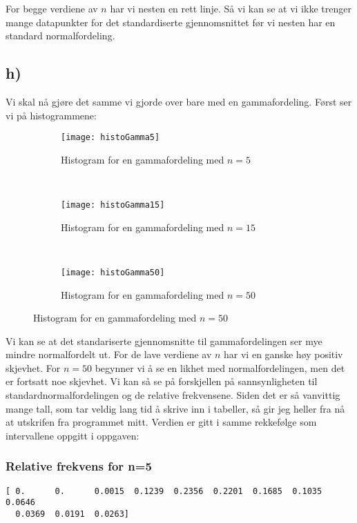 \documentclass[a4paper,norsk, 10pt]{article}
\begin{document}
For begge verdiene av $n$ har vi nesten en rett linje. Så vi kan se at vi ikke trenger mange datapunkter for det standardiserte gjennomsnittet før vi nesten har en standard normalfordeling.


\subsection*{h)}

Vi skal nå gjøre det samme vi gjorde over bare med en gammafordeling. Først ser vi på histogrammene:

\begin{figure}[H]
\centering
	\begin{subfigure}[b]{0.4\textwidth}
        \texttt{[image: histoGamma5]}
        \caption{Histogram for en gammafordeling med $n = 5$}
        \label{fig:HG15}
    \end{subfigure}
    ~
    \begin{subfigure}[b]{0.3\textwidth}
        \texttt{[image: histoGamma15]}
        \caption{Histogram for en gammafordeling med $n = 15$}
        \label{fig:HG50}
    \end{subfigure}
     ~
    \begin{subfigure}[b]{0.3\textwidth}
        \texttt{[image: histoGamma50]}
        \caption{Histogram for en gammafordeling med $n = 50$}
        \label{fig:HG50}
    \end{subfigure}
\end{figure}

Vi kan se at det standariserte gjennomsnitte til gammafordelingen ser mye mindre normalfordelt ut. For de lave verdiene av $n$ har vi en ganske høy positiv skjevhet. For $n = 50$ begynner vi å se en likhet med normalfordelingen, men det er fortsatt noe skjevhet. Vi kan så se på forskjellen på sannsynligheten til standardnormalfordelingen og de relative frekvensene. Siden det er så vanvittig mange tall, som tar veldig lang tid å skrive inn i tabeller, så gir jeg heller fra nå at utskrifen fra programmet mitt. Verdien er gitt i samme rekkefølge som intervallene oppgitt i oppgaven:

\subsubsection*{Relative frekvens for n=5}
\begin{Verbatim}[frame = single]
[ 0.      0.      0.0015  0.1239  0.2356  0.2201  0.1685  0.1035  0.0646
  0.0369  0.0191  0.0263]
\end{Verbatim}
\end{document}
